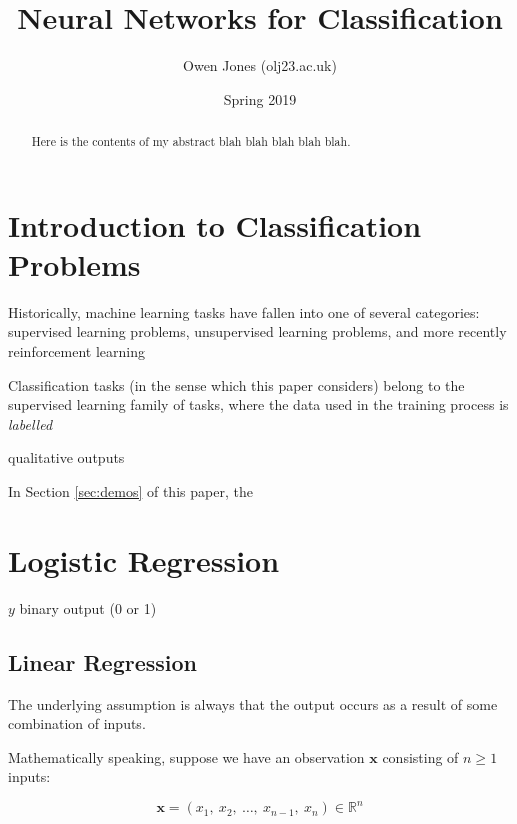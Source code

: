 \documentclass{article}[11pt]
\begin{document}
	
	
	\title{Neural Networks for Classification}
	\author{Owen Jones (olj23\@bath.ac.uk)}
	\date{Spring 2019}
	\maketitle


\begin{abstract}
    
    
	Here is the contents of my abstract blah blah blah blah blah.
\end{abstract}



\section{Introduction to Classification Problems}

    Historically, machine learning tasks have fallen into one of several categories: supervised learning problems, unsupervised learning problems, and more recently reinforcement learning
    
    Classification tasks (in the sense which this paper considers) belong to the supervised learning family of tasks, where the data used in the training process is \textit{labelled}
    
    qualitative outputs
    
    In Section \ref{sec:demos} of this paper, the 


\section{Logistic Regression} \label{sec:logreg}


    $y$ binary output (0 or 1)


    \subsection{Linear Regression}
        
        The underlying assumption is always that the output occurs as a result of some combination of inputs.
        
        Mathematically speaking, suppose we have an observation $\mathbf{x}$ consisting of $n \geq 1$ inputs:
        
        $$
        \mathbf{x} = (x_1, \ x_2, \ \ldots, \ x_{n-1}, \ x_n) \in \mathbb{R}^n
        $$
        
\end{document}
